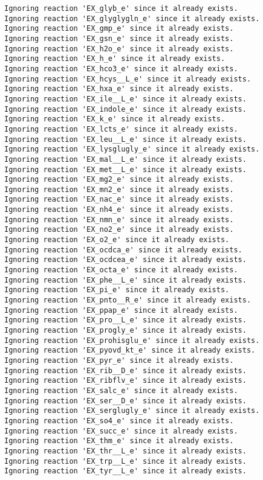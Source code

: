 \documentclass[
  letterpaper,
  DIV=11,
  numbers=noendperiod]{scrartcl}
\begin{document}
\begin{verbatim}
Ignoring reaction 'EX_glyb_e' since it already exists.
Ignoring reaction 'EX_glyglygln_e' since it already exists.
Ignoring reaction 'EX_gmp_e' since it already exists.
Ignoring reaction 'EX_gsn_e' since it already exists.
Ignoring reaction 'EX_h2o_e' since it already exists.
Ignoring reaction 'EX_h_e' since it already exists.
Ignoring reaction 'EX_hco3_e' since it already exists.
Ignoring reaction 'EX_hcys__L_e' since it already exists.
Ignoring reaction 'EX_hxa_e' since it already exists.
Ignoring reaction 'EX_ile__L_e' since it already exists.
Ignoring reaction 'EX_indole_e' since it already exists.
Ignoring reaction 'EX_k_e' since it already exists.
Ignoring reaction 'EX_lcts_e' since it already exists.
Ignoring reaction 'EX_leu__L_e' since it already exists.
Ignoring reaction 'EX_lysglugly_e' since it already exists.
Ignoring reaction 'EX_mal__L_e' since it already exists.
Ignoring reaction 'EX_met__L_e' since it already exists.
Ignoring reaction 'EX_mg2_e' since it already exists.
Ignoring reaction 'EX_mn2_e' since it already exists.
Ignoring reaction 'EX_nac_e' since it already exists.
Ignoring reaction 'EX_nh4_e' since it already exists.
Ignoring reaction 'EX_nmn_e' since it already exists.
Ignoring reaction 'EX_no2_e' since it already exists.
Ignoring reaction 'EX_o2_e' since it already exists.
Ignoring reaction 'EX_ocdca_e' since it already exists.
Ignoring reaction 'EX_ocdcea_e' since it already exists.
Ignoring reaction 'EX_octa_e' since it already exists.
Ignoring reaction 'EX_phe__L_e' since it already exists.
Ignoring reaction 'EX_pi_e' since it already exists.
Ignoring reaction 'EX_pnto__R_e' since it already exists.
Ignoring reaction 'EX_ppap_e' since it already exists.
Ignoring reaction 'EX_pro__L_e' since it already exists.
Ignoring reaction 'EX_progly_e' since it already exists.
Ignoring reaction 'EX_prohisglu_e' since it already exists.
Ignoring reaction 'EX_pyovd_kt_e' since it already exists.
Ignoring reaction 'EX_pyr_e' since it already exists.
Ignoring reaction 'EX_rib__D_e' since it already exists.
Ignoring reaction 'EX_ribflv_e' since it already exists.
Ignoring reaction 'EX_salc_e' since it already exists.
Ignoring reaction 'EX_ser__D_e' since it already exists.
Ignoring reaction 'EX_serglugly_e' since it already exists.
Ignoring reaction 'EX_so4_e' since it already exists.
Ignoring reaction 'EX_succ_e' since it already exists.
Ignoring reaction 'EX_thm_e' since it already exists.
Ignoring reaction 'EX_thr__L_e' since it already exists.
Ignoring reaction 'EX_trp__L_e' since it already exists.
Ignoring reaction 'EX_tyr__L_e' since it already exists.

\end{verbatim}
\end{document}
